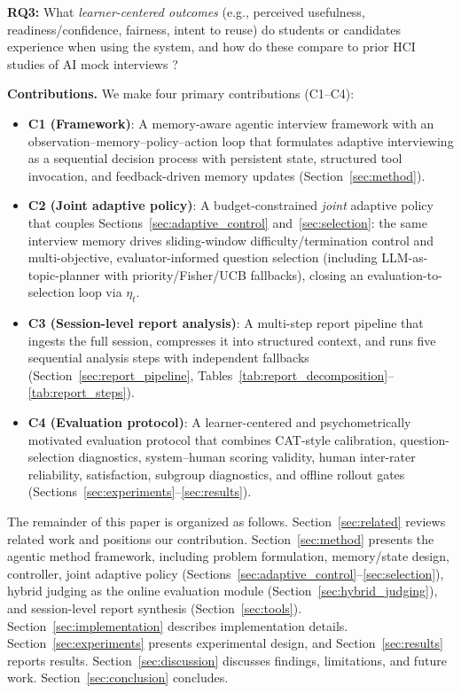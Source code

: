 ﻿\documentclass[final,3p,times,authoryear]{elsarticle}
\begin{document}
\textbf{RQ3:} What \emph{learner-centered outcomes} (e.g., perceived usefulness, readiness/confidence, fairness, intent to reuse) do students or candidates experience when using the system, and how do these compare to prior HCI studies of AI mock interviews \cite{conversate2024,virtual_interviewers2025}?

\noindent \textbf{Contributions.} We make four primary contributions (C1--C4):
\begin{itemize}
    \item \textbf{C1 (Framework)}: A memory-aware agentic interview framework with an observation--memory--policy--action loop that formulates adaptive interviewing as a sequential decision process with persistent state, structured tool invocation, and feedback-driven memory updates (Section~\ref{sec:method}).
    \item \textbf{C2 (Joint adaptive policy)}: A budget-constrained \emph{joint} adaptive policy that couples Sections~\ref{sec:adaptive_control} and~\ref{sec:selection}: the same interview memory drives sliding-window difficulty/termination control and multi-objective, evaluator-informed question selection (including LLM-as-topic-planner with priority/Fisher/UCB fallbacks), closing an evaluation-to-selection loop via $\eta_t$.
    \item \textbf{C3 (Session-level report analysis)}: A multi-step report pipeline that ingests the full session, compresses it into structured context, and runs five sequential analysis steps with independent fallbacks (Section~\ref{sec:report_pipeline}, Tables~\ref{tab:report_decomposition}--\ref{tab:report_steps}).
    \item \textbf{C4 (Evaluation protocol)}: A learner-centered and psychometrically motivated evaluation protocol that combines CAT-style calibration, question-selection diagnostics, system--human scoring validity, human inter-rater reliability, satisfaction, subgroup diagnostics, and offline rollout gates (Sections~\ref{sec:experiments}--\ref{sec:results}).
\end{itemize}

The remainder of this paper is organized as follows. Section~\ref{sec:related} reviews related work and positions our contribution. Section~\ref{sec:method} presents the agentic method framework, including problem formulation, memory/state design, controller, joint adaptive policy (Sections~\ref{sec:adaptive_control}--\ref{sec:selection}), hybrid judging as the online evaluation module (Section~\ref{sec:hybrid_judging}), and session-level report synthesis (Section~\ref{sec:tools}). Section~\ref{sec:implementation} describes implementation details. Section~\ref{sec:experiments} presents experimental design, and Section~\ref{sec:results} reports results. Section~\ref{sec:discussion} discusses findings, limitations, and future work. Section~\ref{sec:conclusion} concludes.
\end{document}
